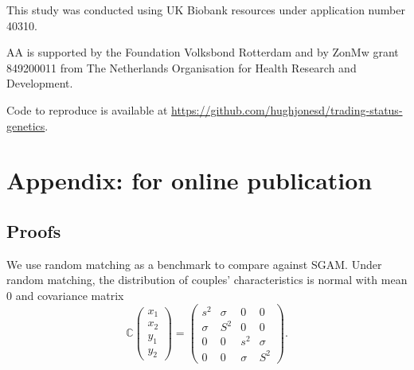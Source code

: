 \documentclass[
  12pt,
]{article}
\theoremstyle{definition}
\theoremstyle{definition}
\theoremstyle{definition}
\theoremstyle{definition}
\theoremstyle{remark}
\begin{document}
This study was conducted using UK Biobank resources under application
number 40310.

AA is supported by the Foundation Volksbond Rotterdam and by ZonMw grant
849200011 from The Netherlands Organisation for Health Research and
Development.

Code to reproduce is available at
\url{https://github.com/hughjonesd/trading-status-genetics}.

\FloatBarrier

\newpage

\section{Appendix: for online publication}\label{appendix-for-online-publication}

\localtableofcontents
\clearpage

\subsection{Proofs}\label{proofs}

We use random matching as a benchmark to compare against SGAM. Under
random matching, the distribution of couples' characteristics is normal with
mean 0 and covariance matrix
\[
\mathbb{C}\left( 
\begin{array}{c}
x_{1} \\ 
x_{2} \\ 
y_{1} \\ 
y_{2}%
\end{array}%
\right) =\allowbreak \left( 
\begin{array}{cccc}
s^{2} & \sigma & 0 & 0 \\ 
\sigma & S^{2} & 0 & 0 \\ 
0 & 0 & s^{2} & \sigma \\ 
0 & 0 & \sigma & S^{2}%
\end{array}%
\right). \allowbreak 
\]
\end{document}
